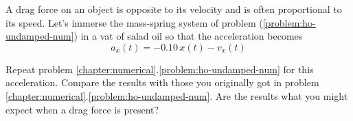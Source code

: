 \begin{problem}
  A drag force on an object is opposite to its velocity and is often
  proportional to its speed.  Let's immerse the mass-spring system of
  problem (\ref{problem:ho-undamped-num}) in a vat of salad oil so
  that the acceleration becomes
  \[a_x(t) = -0.10\, x(t) - v_x(t)\] 

  Repeat problem \ref{chapter:numerical}.\ref{problem:ho-undamped-num}
  for this acceleration.  Compare the results with those you
  originally got in problem
  \ref{chapter:numerical}.\ref{problem:ho-undamped-num}.  Are the
  results what you might expect when a drag force is present?
\end{problem}
